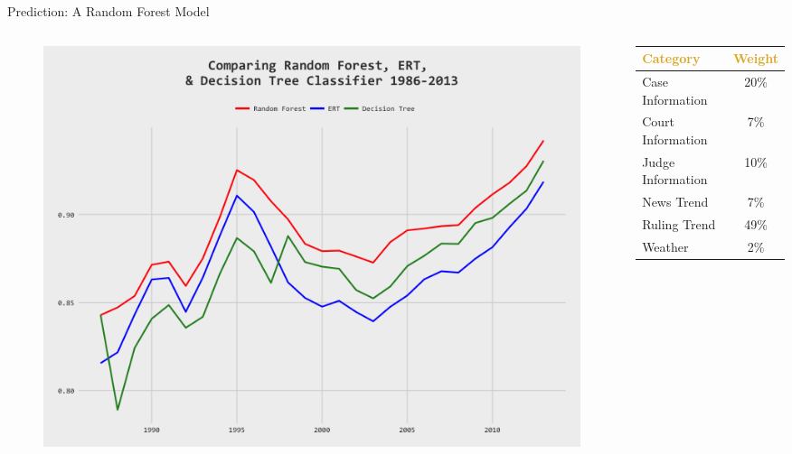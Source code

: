 \begin{frame}{Prediction: A Random Forest Model}
    \begin{columns}
    \begin{column}{0.6\textwidth}

        \begin{figure}\label{fig:RF}
            \centering
            \includegraphics[height = 0.7 \textheight]{images/RF_ERT_DT_Comp.png}
            \end{figure}
    \end{column}
        
    \begin{column}{0.35\textwidth}
        \begin{table}[h!]
            \small
            \begin{center}
              \begin{tabular}{lc}
                
                \textcolor{goldenrod}{\textbf{Category}} & \textcolor{goldenrod}{\textbf{Weight}}  \\
                \hline
                Case Information & 20\%\\
                Court Information & 7\%\\
                Judge Information & 10\%\\
                News Trend & 7\%\\
                Ruling Trend & 49\%\\
                Weather & 2\%
              \end{tabular}
            \end{center}
          \end{table}
    \end{column}
        
    \end{columns}
    
\end{frame}

